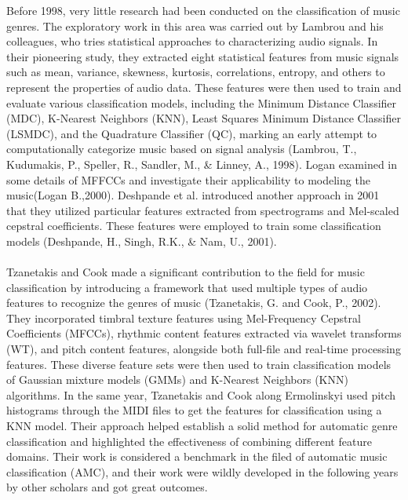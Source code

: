 Before 1998, very little research had been conducted on the classification of music genres. The exploratory work in this area was carried out by Lambrou and his colleagues, who tries statistical approaches to characterizing audio signals. In their pioneering study, they extracted eight statistical features from music signals such as mean, variance, skewness, kurtosis, correlations, entropy, and others to represent the properties of audio data. These features were then used to train and evaluate various classification models, including the Minimum Distance Classifier (MDC), K-Nearest Neighbors (KNN), Least Squares Minimum Distance Classifier (LSMDC), and the Quadrature Classifier (QC), marking an early attempt to computationally categorize music based on signal analysis (Lambrou, T., Kudumakis, P., Speller, R., Sandler, M., \& Linney, A., 1998). Logan examined in some details of MFFCCs and investigate their applicability to modeling the music(Logan B.,2000). Deshpande et al. introduced another approach in 2001 that they utilized particular features extracted from spectrograms and Mel-scaled cepstral coefficients. These features were employed to train some classification models (Deshpande, H., Singh, R.K., \& Nam, U., 2001).\\
\\
Tzanetakis and Cook made a significant contribution to the field for music classification by introducing a framework that used multiple types of audio features to recognize the genres of music (Tzanetakis, G. and Cook, P., 2002). They incorporated timbral texture features using Mel-Frequency Cepstral Coefficients (MFCCs), rhythmic content features extracted via wavelet transforms (WT), and pitch content features, alongside both full-file and real-time processing features. These diverse feature sets were then used to train classification models of Gaussian mixture models (GMMs) and K-Nearest Neighbors (KNN) algorithms. In the same year, Tzanetakis and Cook along Ermolinskyi used pitch histograms through the MIDI files to get the features for classification using a KNN model. Their approach helped establish a solid method for automatic genre classification and highlighted the effectiveness of combining different feature domains. Their work is considered a benchmark in the filed of automatic music classification (AMC), and their work were wildly developed in the following years by other scholars and got great outcomes.\\
\\
